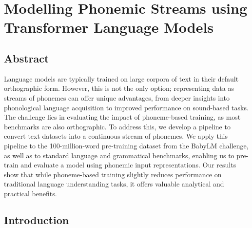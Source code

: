 \chapter{Modelling Phonemic Streams using Transformer Language Models}

\section{Abstract}

Language models are typically trained on large corpora of text in their default orthographic form. However, this is not the only option; representing data as streams of phonemes can offer unique advantages, from deeper insights into phonological language acquisition to improved performance on sound-based tasks. The challenge lies in evaluating the impact of phoneme-based training, as most benchmarks are also orthographic. To address this, we develop a pipeline to convert text datasets into a continuous stream of phonemes. We apply this pipeline to the 100-million-word pre-training dataset from the BabyLM challenge, as well as to standard language and grammatical benchmarks, enabling us to pre-train and evaluate a model using phonemic input representations. Our results show that while phoneme-based training slightly reduces performance on traditional language understanding tasks, it offers valuable analytical and practical benefits. 


\section{Introduction}

